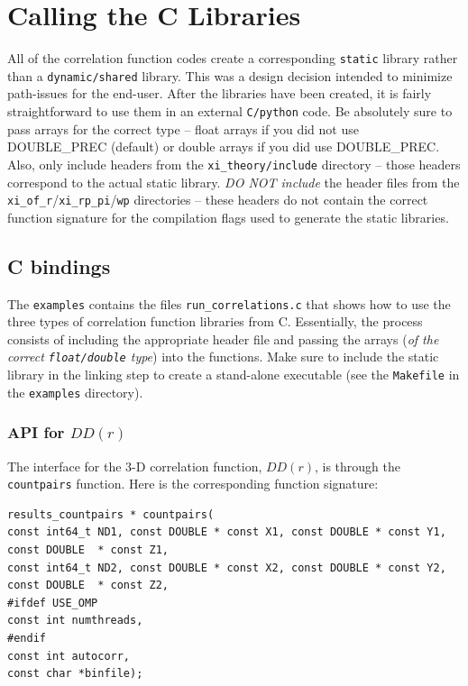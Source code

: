 \documentclass[12pt,titlepage]{article}
\newcommand{\xir}{\ensuremath{{DD(r)}}\xspace}
\begin{document}
\section{Calling the C Libraries}
All of the correlation function codes create a corresponding \texttt{static} library rather than a \texttt{dynamic/shared} library. This was a design decision intended 
to minimize path-issues for the end-user. After the libraries have been created, it is fairly straightforward to use them in an external \texttt{C/python} code.  
Be absolutely sure to pass arrays for the correct type -- float arrays if you did not use DOUBLE\_PREC (default) or double arrays if you did use DOUBLE\_PREC. 
Also, only include headers from the \texttt{xi\_theory/include} directory -- those headers correspond to the actual static library. {\em DO NOT include} 
the header files from the \texttt{xi\_of\_r}/\texttt{xi\_rp\_pi}/\texttt{wp} directories -- these headers do not contain the correct function signature for 
the compilation flags used to generate the static libraries. 

\subsection{C bindings}
The \texttt{examples} contains the files \texttt{run\_correlations.c} that shows how to use the three types of correlation function libraries from C. Essentially, the process 
consists of including the appropriate header file and passing the arrays ({\em of the correct \texttt{float/double} type}) into the functions. Make sure to include the static 
library in the linking step to create a stand-alone executable (see the \texttt{Makefile} in the \texttt{examples} directory). 

\subsubsection{API for \texorpdfstring{\xir}{xi(r)}}
The interface for the 3-D correlation function, \xir, is through the \texttt{countpairs} function. Here is 
the corresponding function signature:
\begin{lstlisting}[label={code:API_DD},caption={API for the 3-D \xir.}]
results_countpairs * countpairs(
const int64_t ND1, const DOUBLE * const X1, const DOUBLE * const Y1, const DOUBLE  * const Z1,
const int64_t ND2, const DOUBLE * const X2, const DOUBLE * const Y2, const DOUBLE  * const Z2,
#ifdef USE_OMP
const int numthreads,
#endif
const int autocorr,
const char *binfile);
\end{lstlisting}
\end{document}
